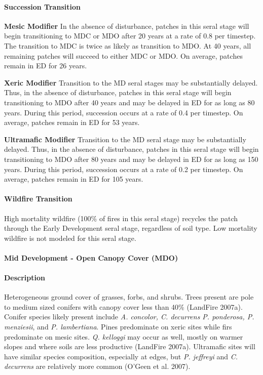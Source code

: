 \paragraph{Succession Transition}

\begin{adjustwidth}{2cm}{}
\textbf{Mesic Modifier } In the absence of disturbance, patches in this seral stage will begin transitioning to MDC or MDO after 20 years at a rate of 0.8 per timestep. The transition to MDC is twice as likely as transition to MDO.  At 40 years, all remaining patches will succeed to either MDC or MDO. On average, patches remain in ED for 26 years.

\medskip
\noindent \textbf{Xeric Modifier}  Transition to the MD seral stages may be substantially delayed. Thus, in the absence of disturbance, patches in this seral stage will begin transitioning to MDO after 40 years and may be delayed in ED for as long as 80 years. During this period, succession occurs at a rate of 0.4 per timestep. On average, patches remain in ED for 53 years.

\medskip
\noindent \textbf{Ultramafic Modifier}  Transition to the MD seral stage may be substantially delayed. Thus, in the absence of disturbance, patches in this seral stage will begin transitioning to MDO after 80 years and may be delayed in ED for as long as 150 years. During this period, succession occurs at a rate of 0.2 per timestep. On average, patches remain in ED for 105 years.

\end{adjustwidth}



\paragraph{Wildfire Transition} High mortality wildfire (100\% of fires in this seral stage) recycles the patch through the Early Development seral stage, regardless of soil type. Low mortality wildfire is not modeled for this seral stage. 

\noindent\hrulefill


\paragraph{Mid Development - Open Canopy Cover (MDO)} 

\paragraph{Description} Heterogeneous ground cover of grasses, forbs, and shrubs. Trees present are pole to medium sized conifers with canopy cover less than 40\% (LandFire 2007a). Conifer species likely present include \emph{A. concolor, C. decurrens P. ponderosa, P. menziesii}, and \emph{P. lambertiana}. Pines predominate on xeric sites while firs predominate on mesic sites. \emph{Q. kelloggi} may occur as well, mostly on warmer slopes and where soils are less productive (LandFire 2007a). Ultramafic sites will have similar species composition, especially at edges, but \emph{P. jeffreyi} and \emph{C. decurrens} are relatively more common (O'Geen et al. 2007).

